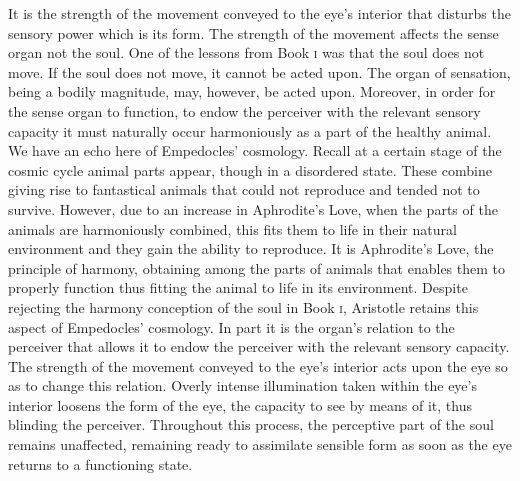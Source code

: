 It is the strength of the movement conveyed to the eye's interior that disturbs the sensory power which is its form. The strength of the movement affects the sense organ not the soul. One of the lessons from Book \textsc{i} was that the soul does not move. If the soul does not move, it cannot be acted upon. The organ of sensation, being a bodily magnitude, may, however, be acted upon. Moreover, in order for the sense organ to function, to endow the perceiver with the relevant sensory capacity it must naturally occur harmoniously as a part of the healthy animal. We have an echo here of Empedocles' cosmology. Recall at a certain stage of the cosmic cycle animal parts appear, though in a disordered state. These combine giving rise to fantastical animals that could not reproduce and tended not to survive. However, due to an increase in Aphrodite's Love, when the parts of the animals are harmoniously combined, this fits them to life in their natural environment and they gain the ability to reproduce. It is Aphrodite's Love, the principle of harmony, obtaining among the parts of animals that enables them to properly function thus fitting the animal to life in its environment. Despite rejecting the harmony conception of the soul in Book \textsc{i}, Aristotle retains this aspect of Empedocles' cosmology. In part it is the organ's relation to the perceiver that allows it to endow the perceiver with the relevant sensory capacity. The strength of the movement conveyed to the eye's interior acts upon the eye so as to change this relation. Overly intense illumination taken within the eye's interior loosens the form of the eye, the capacity to see by means of it, thus blinding the perceiver. Throughout this process, the perceptive part of the soul remains unaffected, remaining ready to assimilate sensible form as soon as the eye returns to a functioning state.


